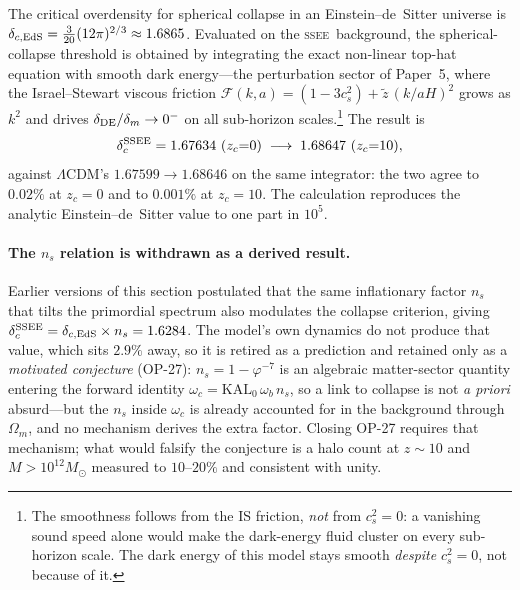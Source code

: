 \documentclass[12pt,a4paper]{article}
\newcommand{\SSEE}{\ifmmode\mathrm{SSEE}\else\textsc{ssee}\fi}
\begin{document}
The critical overdensity for spherical collapse in an Einstein--de~Sitter universe is
$\delta_{c,\rm EdS} = \tfrac{3}{20}(12\pi)^{2/3} \approx 1.6865$.
Evaluated on the \SSEE\ background, the spherical-collapse threshold is
obtained by integrating the exact non-linear top-hat equation with smooth dark
energy---the perturbation sector of Paper~5, where the Israel--Stewart viscous
friction $\mathcal{F}(k,a) = (1-3c_s^2) + \tilde z\,(k/aH)^2$ grows as $k^2$ and
drives $\delta_{\rm DE}/\delta_m \to 0^-$ on all sub-horizon
scales.\footnote{The smoothness follows from the IS friction, \emph{not} from
$c_s^2=0$: a vanishing sound speed alone would make the dark-energy fluid
cluster on every sub-horizon scale. The dark energy of this model stays smooth
\emph{despite} $c_s^2=0$, not because of it.}
The result is
\begin{equation}
\delta_c^{\rm SSEE} = 1.67634\ (z_c{=}0) \;\longrightarrow\; 1.68647\ (z_c{=}10),
\label{eq:deltac}
\end{equation}
against $\Lambda$CDM's $1.67599 \to 1.68646$ on the same integrator: the two
agree to $0.02\%$ at $z_c=0$ and to $0.001\%$ at $z_c=10$. The calculation
reproduces the analytic Einstein--de~Sitter value to one part in $10^{5}$.

\paragraph{The $n_s$ relation is withdrawn as a derived result.}
Earlier versions of this section postulated that the same inflationary factor
$n_s$ that tilts the primordial spectrum also modulates the collapse criterion,
giving $\delta_c^{\rm SSEE} = \delta_{c,\rm EdS}\times n_s = 1.6284$. The
model's own dynamics do not produce that value, which sits $2.9\%$ away, so it
is retired as a prediction and retained only as a \emph{motivated conjecture}
(OP-27): $n_s = 1-\varphi^{-7}$ is an algebraic matter-sector quantity entering
the forward identity $\omega_c = \mathrm{KAL}_0\,\omega_b\,n_s$, so a link to
collapse is not \emph{a priori} absurd---but the $n_s$ inside $\omega_c$ is
already accounted for in the background through $\Omega_m$, and no mechanism
derives the extra factor. Closing OP-27 requires that mechanism; what would
falsify the conjecture is a halo count at $z\sim10$ and $M>10^{12}M_\odot$
measured to $10$--$20\%$ and consistent with unity.
\end{document}
